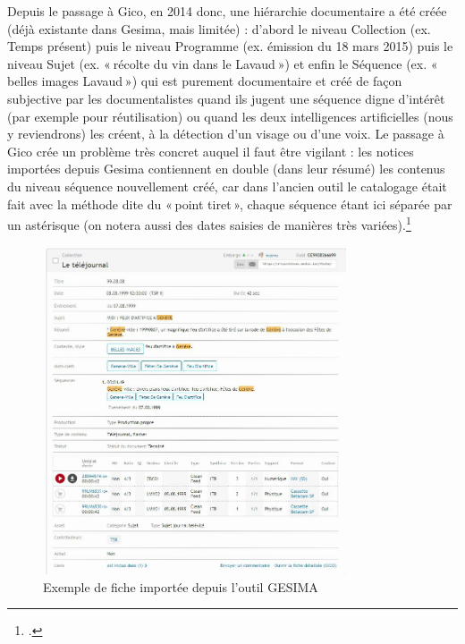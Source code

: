 Depuis le passage à Gico, en 2014 donc, une hiérarchie documentaire a été créée (déjà existante dans Gesima, mais limitée) : d’abord le niveau Collection (ex. Temps présent) puis le niveau Programme (ex. émission du 18 mars 2015) puis le niveau Sujet (ex. « récolte du vin dans le Lavaud ») et enfin le Séquence (ex. « belles images Lavaud ») qui est purement documentaire et créé de façon subjective par les documentalistes quand ils jugent une séquence digne d’intérêt (par exemple pour réutilisation) ou quand les deux intelligences artificielles (nous y reviendrons) les créent, à la détection d’un visage ou d’une voix. Le passage à Gico crée un problème très concret auquel il faut être vigilant : les notices importées depuis Gesima contiennent en double (dans leur résumé) les contenus du niveau séquence nouvellement créé, car dans l’ancien outil le catalogage était fait avec la méthode dite du « point tiret », chaque séquence étant ici séparée par un astérisque (on notera aussi des dates saisies de manières très variées).\footcite{sonderegger2024}



\begin{figure}[h!]
	\centering
	\includegraphics[width=0.8\textwidth]{images/image1.png}
	\caption{Exemple de fiche importée depuis l'outil GESIMA}
	\label{fig:image1}
\end{figure}


